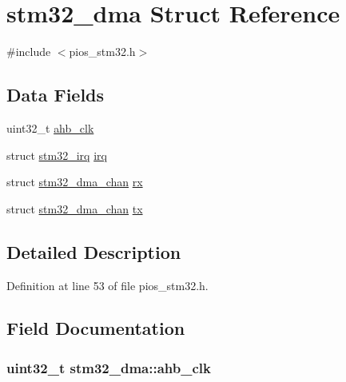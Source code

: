 \hypertarget{structstm32__dma}{\section{stm32\-\_\-dma \-Struct \-Reference}
\label{structstm32__dma}
}


{\ttfamily \#include $<$pios\-\_\-stm32.\-h$>$}

\subsection*{\-Data \-Fields}
\begin{DoxyCompactItemize}
\item 
uint32\-\_\-t \hyperlink{structstm32__dma_afdea0b36c63695ba4374a72291d8b6f1}{ahb\-\_\-clk}
\item 
struct \hyperlink{structstm32__irq}{stm32\-\_\-irq} \hyperlink{structstm32__dma_ae18ccde217e150c9de5b55b43d110a9d}{irq}
\item 
struct \hyperlink{structstm32__dma__chan}{stm32\-\_\-dma\-\_\-chan} \hyperlink{structstm32__dma_a967c78ffd2d021ac268f1d8c0a2c7e30}{rx}
\item 
struct \hyperlink{structstm32__dma__chan}{stm32\-\_\-dma\-\_\-chan} \hyperlink{structstm32__dma_a4ef0eab3e87fc579e24c36e51d31b88a}{tx}
\end{DoxyCompactItemize}


\subsection{\-Detailed \-Description}


\-Definition at line 53 of file pios\-\_\-stm32.\-h.



\subsection{\-Field \-Documentation}
\hypertarget{structstm32__dma_afdea0b36c63695ba4374a72291d8b6f1}{
\subsubsection[{ahb\-\_\-clk}]{\setlength{\rightskip}{0pt plus 5cm}uint32\-\_\-t {\bf stm32\-\_\-dma\-::ahb\-\_\-clk}}}\label{structstm32__dma_afdea0b36c63695ba4374a72291d8b6f1}



